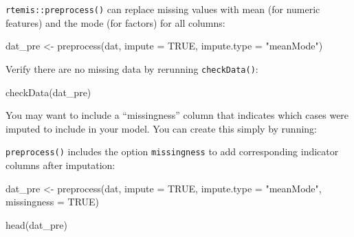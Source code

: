 \documentclass[
]{book}
\newenvironment{Shaded}{\begin{snugshade}}{\end{snugshade}}
\newcommand{\AttributeTok}[1]{\textcolor[rgb]{0.77,0.63,0.00}{#1}}
\newcommand{\ConstantTok}[1]{\textcolor[rgb]{0.00,0.00,0.00}{#1}}
\newcommand{\FunctionTok}[1]{\textcolor[rgb]{0.00,0.00,0.00}{#1}}
\newcommand{\NormalTok}[1]{#1}
\newcommand{\OtherTok}[1]{\textcolor[rgb]{0.56,0.35,0.01}{#1}}
\newcommand{\SpecialCharTok}[1]{\textcolor[rgb]{0.00,0.00,0.00}{#1}}
\newcommand{\StringTok}[1]{\textcolor[rgb]{0.31,0.60,0.02}{#1}}
\begin{document}
\texttt{rtemis::preprocess()} can replace missing values with mean (for numeric features) and the mode (for factors) for all columns:

\begin{Shaded}
\begin{Highlighting}[]
\NormalTok{dat\_pre }\OtherTok{\textless{}{-}} \FunctionTok{preprocess}\NormalTok{(dat, }\AttributeTok{impute =} \ConstantTok{TRUE}\NormalTok{, }\AttributeTok{impute.type =} \StringTok{"meanMode"}\NormalTok{)}
\end{Highlighting}
\end{Shaded}

Verify there are no missing data by rerunning \texttt{checkData()}:

\begin{Shaded}
\begin{Highlighting}[]
\FunctionTok{checkData}\NormalTok{(dat\_pre)}
\end{Highlighting}
\end{Shaded}

You may want to include a ``missingness'' column that indicates which cases were imputed to include in your model. You can create this simply by running:

\begin{Shaded}
\end{Shaded}

\texttt{preprocess()} includes the option \texttt{missingness} to add corresponding indicator columns after imputation:

\begin{Shaded}
\begin{Highlighting}[]
\NormalTok{dat\_pre }\OtherTok{\textless{}{-}} \FunctionTok{preprocess}\NormalTok{(dat, }\AttributeTok{impute =} \ConstantTok{TRUE}\NormalTok{, }\AttributeTok{impute.type =} \StringTok{"meanMode"}\NormalTok{,}
                      \AttributeTok{missingness =} \ConstantTok{TRUE}\NormalTok{)}
\end{Highlighting}
\end{Shaded}

\begin{Shaded}
\begin{Highlighting}[]
\FunctionTok{head}\NormalTok{(dat\_pre)}
\end{Highlighting}
\end{Shaded}
\end{document}
